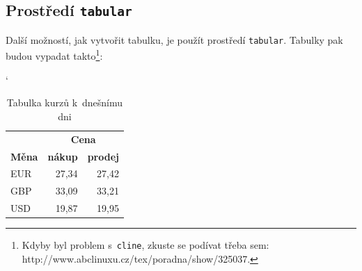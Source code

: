 \documentclass[11pt,a4paper]{article}
\begin{document}
\subsection{Prostředí \texttt{tabular}}
Další možností, jak vytvořit tabulku, je použít prostředí \texttt{tabular}. Tabulky pak 
budou vypadat takto\footnote{Kdyby byl problem s~\texttt{cline}, zkuste se podívat třeba sem: 
http://www.abclinuxu.cz/tex/poradna/show/325037.}:
\begin{table}[h]
    \catcode`
    \begin{center}
    \begin{tabular}{|l|r|r|}
        \hline
        & \multicolumn{2}{|c|}{\bf Cena} \\ \cline{2-3}
        \bf Měna & \bf nákup & \bf prodej \\ \hline
        EUR & 27,34 & 27,42 \\
        GBP & 33,09 & 33,21 \\
        USD & 19,87 & 19,95 \\ \hline
    \end{tabular}
    \end{center}
    \caption{Tabulka kurzů k~dnešnímu dni}
    \label{tab1}
\end{table}
\end{document}
